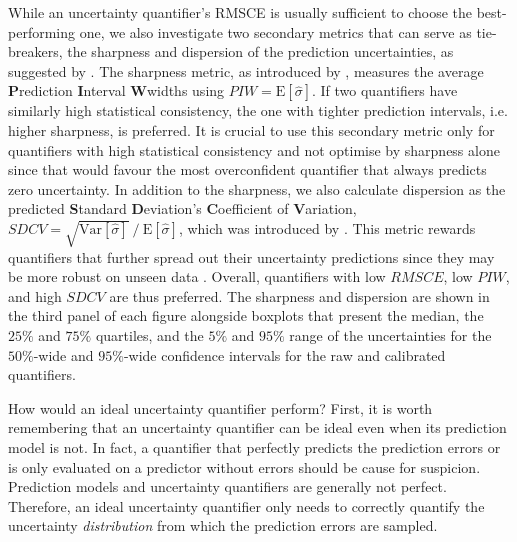 While an uncertainty quantifier's RMSCE is usually sufficient to choose the best-performing one, we also investigate two secondary metrics that can serve as tie-breakers, the sharpness and dispersion of the prediction uncertainties, as suggested by \textcite{uncertainty-metrics-2023}. The sharpness metric, as introduced by \textcite{uncertainty-sharpness-2007}, measures the average \textbf{P}rediction \textbf{I}nterval \textbf{W}widths using $PIW = \text{E}[\hat{\sigma}]$. If two quantifiers have similarly high statistical consistency, the one with tighter prediction intervals, i.e. higher sharpness, is preferred. It is crucial to use this secondary metric only for quantifiers with high statistical consistency and not optimise by sharpness alone since that would favour the most overconfident quantifier that always predicts zero uncertainty. In addition to the sharpness, we also calculate dispersion as the predicted \textbf{S}tandard \textbf{D}eviation's \textbf{C}oefficient of \textbf{V}ariation, $SDCV = \sqrt{\text{Var}[\hat{\sigma}]} \mathbin{/} \text{E}[\hat{\sigma}]$, which was introduced by \textcite{uncertainty-dispersion-2019}. This metric rewards quantifiers that further spread out their uncertainty predictions since they may be more robust on unseen data \cite{uncertainty-metrics-2023}. Overall, quantifiers with low $RMSCE$, low $PIW$, and high $SDCV$ are thus preferred. The sharpness and dispersion are shown in the third panel of each figure alongside boxplots that present the median, the $25\%$ and $75\%$ quartiles, and the $5\%$ and $95\%$ range of the uncertainties for the $50\%$-wide and $95\%$-wide confidence intervals for the raw and calibrated quantifiers.

\newpar How would an ideal uncertainty quantifier perform? First, it is worth remembering that an uncertainty quantifier can be ideal even when its prediction model is not. In fact, a quantifier that perfectly predicts the prediction errors or is only evaluated on a predictor without errors should be cause for suspicion. Prediction models and uncertainty quantifiers are generally not perfect. Therefore, an ideal uncertainty quantifier only needs to correctly quantify the uncertainty \textit{distribution} from which the prediction errors are sampled.

